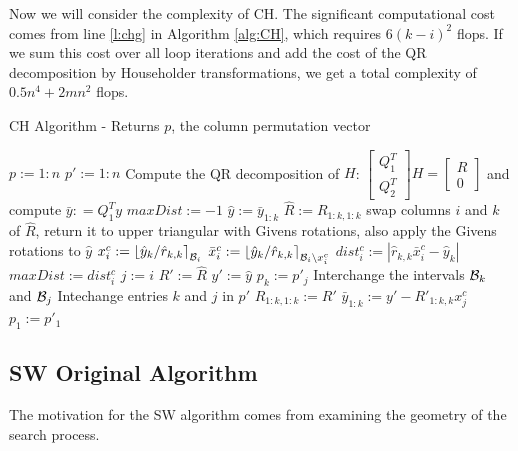 \documentclass[12pt,Bold,letterpaper]{mcgilletdclass}
\newcommand{\bsmx}{\left[\begin{smallmatrix}}
\newcommand{\esmx}{\end{smallmatrix}\right]}
\newcommand{\vsp}{\vspace{\baselineskip}}
\begin{document}
Now we will consider the complexity of CH. The 
significant computational cost comes from line \ref{l:chg} in Algorithm \ref{alg:CH},
which requires $6(k-i)^2$ flops.
If we sum this cost over all loop iterations and add the cost of the QR decomposition by Householder transformations, 
we  get a total complexity of $0.5n^4+2mn^2$ flops.

\begin{algorithm}
\caption{CH Algorithm - Returns $p$, the column permutation vector}
\label{alg:CH}
\begin{algorithmic}[1]
\STATE $p := 1:n$
\STATE $p' := 1:n$
\STATE Compute the QR decomposition of $H$: $\bsmx Q_1^T \\ Q_2^T \esmx H= \bsmx R\\ 0 \esmx$
             and compute  $\bar{y} : = Q_1^Ty$
  	\STATE $maxDist := -1$
    	\STATE $\hat{y} := \bar{y}_{1:k}$
    	\STATE $\hat{R} := R_{1:k,1:k}$
        \STATE  \label{l:chg} swap columns $i$ and $k$ of $\hat{R}$, return it  to upper
triangular with Givens rotations, also apply the Givens rotations to $\hat{y}$ %
        \STATE $x_i^c := \left \lfloor\hat{y}_k/\hat{r}_{k,k}\right
\rceil_{{\cal B}_i}$
        \STATE $\bar{x}_i^c := \left \lfloor\hat{y}_k/\hat{r}_{k,k}\right
\rceil_{{\cal B}_i\backslash x_i^c}$
        \STATE $dist_i^c := \left | \hat{r}_{k,k}\bar{x}_i^c - \hat{y}_k
\right | $
        	\STATE $maxDist := dist_i^c$
        	\STATE $j := i$
        	\STATE $R' := \hat{R}$
        	\STATE $y' := \hat{y}$
        \ENDIF
    \ENDFOR
    \STATE $p_k := p'_j$
    \STATE Interchange the intervals ${{\cal B}_k}$ and ${{\cal B}_{j}}$
    \STATE Intechange entries $k$ and $j$ in $p'$
    \STATE $R_{1:k,1:k} := R'$
    \STATE $\bar{y}_{1:k} := y' - R'_{1:k,k}x_j^c$
  \ENDFOR
  \STATE $p_1 := p'_1$
\end{algorithmic}
\end{algorithm}

\vsp \subsection{SW Original Algorithm} \label{subsec:SW}
The motivation for the SW algorithm comes from examining the geometry of the search process.
\end{document}
